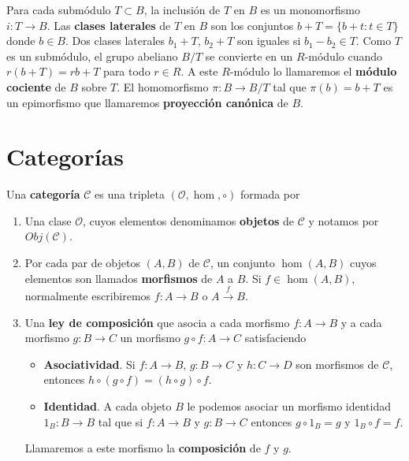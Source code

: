 Para cada submódulo $T \subset B$, la inclusión de $T$ en $B$ es un monomorfismo $i: T \rightarrow B$. Las \textbf{clases laterales} de $T$ en $B$ son los conjuntos $b + T = \{b + t : t \in T\}$ donde $b \in B$. Dos clases laterales $b_1 + T$, $b_2 + T$ son iguales si $b_1 - b_2 \in T$. Como $T$ es un submódulo, el grupo abeliano $B/T$ se convierte en un $R$-módulo cuando $r(b+T) = rb + T$ para todo $r \in R$. A este $R$-módulo lo llamaremos el \textbf{módulo cociente} de $B$ sobre $T$. El homomorfismo $\pi: B \rightarrow B/T$ tal que $\pi(b) = b + T$ es un epimorfismo que llamaremos \textbf{proyección canónica} de $B$.



\section{Categorías}

\begin{definicion}
	Una \textbf{categoría} $\mathcal{C}$ es una tripleta $(\mathcal{O}, \hom, \circ)$ formada por
	\begin{enumerate}
		\item Una clase $\mathcal{O}$, cuyos elementos denominamos \textbf{objetos} de $\mathcal{C}$ y notamos por $Obj(\mathcal{C})$.
		\item Por cada par de objetos $(A,B)$ de $\mathcal{C}$, un conjunto $\hom(A,B)$ cuyos elementos son llamados \textbf{morfismos} de $A$ a $B$. Si $f \in \hom(A,B)$, normalmente escribiremos $f: A \rightarrow B$ o $A \xrightarrow{f} B$.
		\item Una \textbf{ley de composición} que asocia a cada morfismo $f: A \rightarrow B$ y a cada morfismo $g: B \rightarrow C$ un morfismo $g \circ f : A \rightarrow C$ satisfaciendo
		\begin{itemize}
			\item \textbf{Asociatividad}. Si $f: A \rightarrow B$, $g: B \rightarrow C$ y $h : C \rightarrow D$ son morfismos de $\mathcal{C}$, entonces $h \circ (g \circ f) = (h \circ g) \circ f$.
			\item \textbf{Identidad}. A cada objeto $B$ le podemos asociar un morfismo identidad $1_B : B \rightarrow B$ tal que si $f: A \rightarrow B$ y $g: B \rightarrow C$ entonces $g \circ 1_B = g$ y $1_B \circ f = f$.
		\end{itemize}
		Llamaremos a este morfismo la \textbf{composición} de $f$ y $g$.
	\end{enumerate}
\end{definicion}

